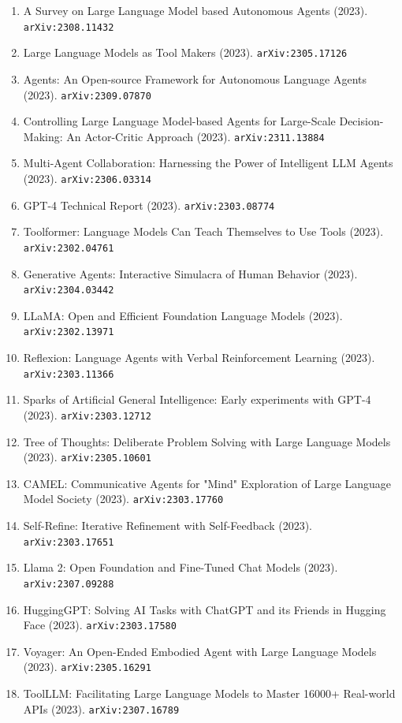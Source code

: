 \documentclass[11pt]{article}
\begin{document}
\begin{enumerate}
  \item A Survey on Large Language Model based Autonomous Agents (2023). \texttt{arXiv:2308.11432}
  \item Large Language Models as Tool Makers (2023). \texttt{arXiv:2305.17126}
  \item Agents: An Open-source Framework for Autonomous Language Agents (2023). \texttt{arXiv:2309.07870}
  \item Controlling Large Language Model-based Agents for Large-Scale
  Decision-Making: An Actor-Critic Approach (2023). \texttt{arXiv:2311.13884}
  \item Multi-Agent Collaboration: Harnessing the Power of Intelligent LLM
  Agents (2023). \texttt{arXiv:2306.03314}
  \item GPT-4 Technical Report (2023). \texttt{arXiv:2303.08774}
  \item Toolformer: Language Models Can Teach Themselves to Use Tools (2023). \texttt{arXiv:2302.04761}
  \item Generative Agents: Interactive Simulacra of Human Behavior (2023). \texttt{arXiv:2304.03442}
  \item LLaMA: Open and Efficient Foundation Language Models (2023). \texttt{arXiv:2302.13971}
  \item Reflexion: Language Agents with Verbal Reinforcement Learning (2023). \texttt{arXiv:2303.11366}
  \item Sparks of Artificial General Intelligence: Early experiments with GPT-4 (2023). \texttt{arXiv:2303.12712}
  \item Tree of Thoughts: Deliberate Problem Solving with Large Language Models (2023). \texttt{arXiv:2305.10601}
  \item CAMEL: Communicative Agents for "Mind" Exploration of Large Language
  Model Society (2023). \texttt{arXiv:2303.17760}
  \item Self-Refine: Iterative Refinement with Self-Feedback (2023). \texttt{arXiv:2303.17651}
  \item Llama 2: Open Foundation and Fine-Tuned Chat Models (2023). \texttt{arXiv:2307.09288}
  \item HuggingGPT: Solving AI Tasks with ChatGPT and its Friends in Hugging
  Face (2023). \texttt{arXiv:2303.17580}
  \item Voyager: An Open-Ended Embodied Agent with Large Language Models (2023). \texttt{arXiv:2305.16291}
  \item ToolLLM: Facilitating Large Language Models to Master 16000+ Real-world
  APIs (2023). \texttt{arXiv:2307.16789}

\end{enumerate}
\end{document}
